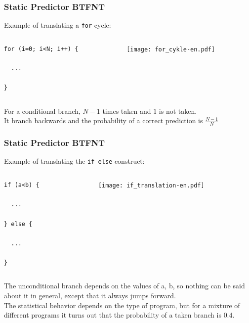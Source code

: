 \documentclass{beamer}
\begin{document}
\begin{frame}[fragile]
\frametitle{Static Predictor BTFNT}

Example of translating a \texttt{for} cycle:

\begin{columns}[T]
\begin{column}{0.4\textwidth}
\begin{verbatim}
for (i=0; i<N; i++) {

  ...
  
}
\end{verbatim}
\end{column}
\begin{column}{0.6\textwidth}
\texttt{[image: for\_cykle-en.pdf]}
\end{column}
\end{columns}
\bigskip
For a conditional branch, $N-1$ times taken and $1$ is not taken.\\
It branch backwards and the probability of a correct prediction is $\frac{N-1}{N}$

\end{frame}

\begin{frame}[fragile]
\frametitle{Static Predictor BTFNT}

Example of translating the \texttt{if else} construct:

\begin{columns}[T]
\begin{column}{0.4\textwidth}
\begin{verbatim}
if (a<b) {
  
  ...

} else {

  ...

}
\end{verbatim}
\end{column}
\begin{column}{0.6\textwidth}
\texttt{[image: if\_translation-en.pdf]}
\end{column}
\end{columns}
\bigskip
The unconditional branch depends on the values of a, b, so nothing can be said about it in general, except that it always jumps forward.\\
The statistical behavior depends on the type of program, but for a mixture of different programs it turns out that the probability of a taken branch is $0.4$.

\end{frame}
\end{document}

